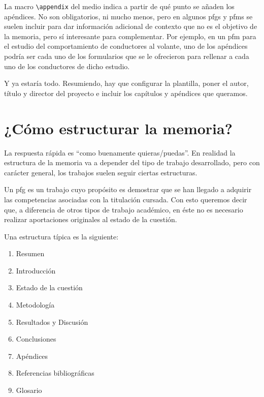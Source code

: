 

La macro \lstinline{\appendix} del medio indica a partir de qué punto se añaden los apéndices. No son obligatorios, ni mucho menos, pero en algunos \glspl{pfg} y \glspl{pfm} se suelen incluir para dar información adicional de contexto que no es el objetivo de la memoria, pero sí interesante para complementar. Por ejemplo, en un \gls{pfm} para el estudio del comportamiento de conductores al volante, uno de los apéndices podría ser cada uno de los formularios que se le ofrecieron para rellenar a cada uno de los conductores de dicho estudio.

Y ya estaría todo. Resumiendo, hay que configurar la plantilla, poner el autor, título y director del proyecto e incluir los capítulos y apéndices que queramos.

\section{¿Cómo estructurar la memoria?}
\label{s:como-estructurar}

La respuesta rápida es \enquote{como buenamente quieras/puedas}. En realidad la estructura de la memoria va a depender del tipo de trabajo desarrollado, pero con carácter general, los trabajos suelen seguir ciertas estructuras.

Un \gls{pfg} es un trabajo cuyo propósito es demostrar que se han llegado a adquirir las competencias asociadas con la titulación cursada. Con esto queremos decir que, a diferencia de otros tipos de trabajo académico, en éste no es necesario realizar aportaciones originales al estado de la cuestión.

Una estructura típica es la siguiente:

\begin{enumerate}
    \item Resumen
    \item Introducción
    \item Estado de la cuestión
    \item Metodología
    \item Resultados y Discusión
    \item Conclusiones
    \item Apéndices
    \item Referencias bibliográficas
    \item Glosario
\end{enumerate}

